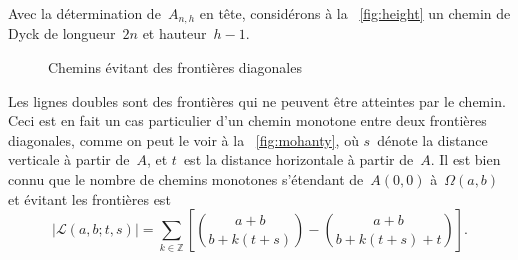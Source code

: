 Avec la détermination de~\(A_{n,h}\) en tête, considérons à la
\fig~\ref{fig:height} un chemin de Dyck de longueur~\(2n\) et
hauteur~\(h-1\).
\begin{figure}[!b]
\centering
{}
\quad
{}
\caption{Chemins évitant des frontières diagonales}
\label{fig:boundaries}
\end{figure}
Les lignes doubles sont des frontières qui ne peuvent être atteintes
par le chemin. Ceci est en fait un cas particulier d'un chemin
monotone entre deux frontières diagonales, comme on peut le voir à la
\fig~\ref{fig:mohanty}, où \(s\)~dénote la distance verticale à partir
de~\(A\), et \(t\)~est la distance horizontale à partir de~\(A\). Il
est bien connu que le nombre de chemins monotones s'étendant
de~\(A(0,0)\) à~\(\Omega(a,b)\) et évitant les frontières est
\begin{equation}
\left\lvert\mathcal{L}(a,b;t,s)\right\rvert = \sum_{k \in \mathbb{Z}}\left[\binom{a+b}{b+k(t+s)} - \binom{a+b}{b+k(t+s)+t}\right].
\label{eq:mohanty}
\end{equation}


